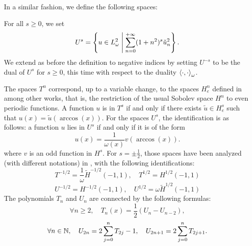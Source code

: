 \documentclass[a4paper]{article}
\begin{document}
\noindent In a similar fashion, we define the following spaces:
\begin{Def}
	For all $s \geq 0$, we set
	\[U^s = \left\{u \in L^2_\omega\mathrel{}\middle|\mathrel{} \sum_{n=0}^{+\infty} (1 + n^2)^s\check{u}_n^2\right\}.\]
	We extend as before the definition to negative indices by setting $U^{-s}$ to be the dual of $U^s$ for $s\geq 0$, this time with respect to the duality $\left\langle \cdot,\cdot\right\rangle_\omega$. 
\end{Def}
The spaces $T^n$ correspond, up to a variable change, to the spaces $H^n_e$ defined in \cite{bruno2012second,atkinson1991numerical,yan1988integral,yan1990cosine} among other works, that is, the restriction of the usual Sobolev space $H^n$ to even periodic functions. A function $u$ is in $T^s$ if and only if there exists $\tilde{u} \in H^s_e$ such that $u(x) = \tilde{u}(\arccos(x))$. For the spaces $U^s$, the identification is as follows: a function $u$ lies in $U^s$ if and only if it is of the form \[ u(x) = \frac{1}{\omega(x)} v(\arccos(x)).\]
where $v$ is an odd function in $H^s$. For $s = \pm \frac{1}{2}$, those spaces have been analyzed (with different notations) in \cite{jerez2012explicit}, with the following identifications:
\begin{equation}
	\label{lemJerez1}
	T^{-1/2} = \frac{1}{\omega} \tilde{H}^{-1/2}(-1,1), \quad T^{1/2} = H^{1/2}(-1,1)
\end{equation}
\begin{equation}
	\label{lemJerez2}
	U^{-1/2} = H^{-1/2}(-1,1), \quad U^{1/2} = \omega \tilde{H}^{1/2}(-1,1)
\end{equation}
\noindent The polynomials $T_n$ and $U_n$ are connected by the following formulas:
\begin{equation}
\label{TnAsUn}
\forall n \geq 2, \quad T_n(x) = \frac{1}{2}\left(U_n - U_{n-2}\right),
\end{equation}
\begin{equation}
\label{UnAsTn}
\forall n \in \mathbb{N}, \quad U_{2n} = 2\sum_{j = 0}^n T_{2j} - 1, \quad U_{2n+1} = 2\sum_{j=0}^n T_{2j+1}.
\end{equation}
\end{document}
